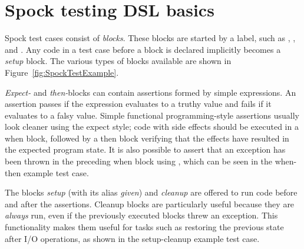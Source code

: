 \section{Spock testing DSL basics}
Spock test cases consist of \textit{blocks}.
These blocks are started by a label,
such as , , and .
Any code in a test case before a block is declared
implicitly becomes a \textit{setup} block.
\autocite{SpockFrameworkDoc}
The various types of blocks available
are shown in Figure~\ref{fig:SpockTestExample}.

\textit{Expect-} and \textit{then-}blocks
can contain assertions formed by simple expressions.
An assertion passes if the expression evaluates to a truthy value
and fails if it evaluates to a falsy value.
Simple functional programming-style assertions
usually look cleaner using the expect style;
code with side effects should be executed in a when block,
followed by a then block verifying that
the effects have resulted in the expected program state.
It is also possible to assert that an exception
has been thrown in the preceding when block using ,
which can be seen in the when-then example test case.

The blocks \textit{setup} (with its alias \textit{given}) and \textit{cleanup}
are offered to run code before and after the assertions.
Cleanup blocks are particularly useful because they are \textit{always} run,
even if the previously executed blocks threw an exception.
\autocite{SpockFrameworkDoc}
This functionality makes them useful for tasks
such as restoring the previous state after I/O operations,
as shown in the setup-cleanup example test case.
